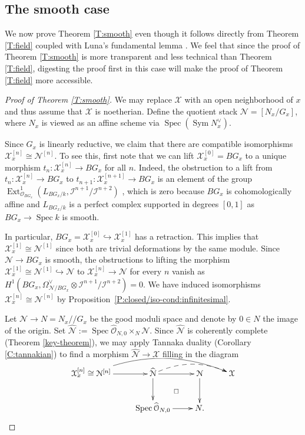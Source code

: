 \documentclass[a4paper]{amsart}
\theoremstyle{plain}
\theoremstyle{definition}
\theoremstyle{remark}
\numberwithin{equation}{section}
\newcommand{\inj}{\hookrightarrow} %
\newcommand\cI{\mathcal{I}}
\newcommand\cN{\mathcal{N}}
\newcommand\cX{\mathcal{X}}
\newcommand\oh{\mathcal{O}}
\DeclareMathOperator{\Spec}{Spec}
\DeclareMathOperator{\Sym}{Sym}
\newcommand{\gitq}{/\!\!/}
\renewcommand{\hat}{\widehat}
\DeclareMathOperator{\Ext}{Ext}
\begin{document}
 
 \subsection{The smooth case} \label{S:smooth}
 We now prove Theorem \ref{T:smooth} even though it follows directly from Theorem \ref{T:field} coupled with Luna's fundamental lemma \cite[p.~94]{luna}.
We feel that since the proof of Theorem \ref{T:smooth} is more transparent and less technical than Theorem \ref{T:field}, digesting the proof first in this case will make the proof of Theorem \ref{T:field} more accessible.
 




\begin{proof}[Proof of Theorem \ref{T:smooth}]
We may replace $\cX$ with an open neighborhood of $x$ and thus assume that
$\cX$ is noetherian. Define the quotient stack $\cN= [N_x/G_x]$, where $N_x$ is viewed as an affine scheme via $\Spec(\Sym N_x^{\vee})$.

Since $G_x$ is linearly reductive, we claim that there are compatible
isomorphisms $\cX_x^{[n]} \cong \cN^{[n]}$. 
To see this, first note that we can lift $\cX_x^{[0]}=BG_x$ to a unique morphism
$t_n\colon \cX_x^{[n]}\to BG_x$ for all $n$. Indeed, the obstruction to a lift from
$t_n\colon \cX_x^{[n]}\to BG_x$ to $t_{n+1}\colon \cX_x^{[n+1]}\to BG_x$ is an
element of the group $\Ext_{\oh_{BG_x}}^{1}(L_{BG_x/k}, \cI^{n+1}/\cI^{n+2})$
\cite{olsson-defn}, which is zero because $BG_x$ is cohomologically affine and
 $L_{BG_x/k}$ is a perfect complex supported in degrees $[0,1]$ as $BG_x\to
\Spec k$ is smooth.

In particular, $BG_x=\cX_x^{[0]}\inj \cX_x^{[1]}$ has a retraction. This implies
that $\cX_x^{[1]} \cong \cN^{[1]}$ since both are trivial deformations by the
same module. Since $\cN\to BG_x$ is smooth, the obstructions to lifting the
morphism $\cX_x^{[1]}\cong \cN^{[1]}\inj \cN$ to $\cX_x^{[n]}\to \cN$ for every $n$
vanish as
$H^1(BG_x,\Omega_{\cN/BG_x}^\vee\otimes \cI^{n+1}/\cI^{n+2})=0$.  We have induced
isomorphisms $\cX_x^{[n]} \cong \cN^{[n]}$ by
Proposition~\ref{P:closed/iso-cond:infinitesimal}.


Let $\cN  \to  N = N_x \gitq G_x$ be the good moduli space and denote by $0 \in N$ the image of the origin.     Set $\hat{\cN} := \Spec \hat{\oh}_{N,0} \times_N \cN$.  Since $\hat{\cN}$ is coherently complete (Theorem \ref{key-theorem}), we may apply Tannaka duality (Corollary \ref{C:tannakian}) to find a morphism $\hat{\cN} \to \cX$ filling in the diagram
\vspace{.2cm}
$$
\xymatrix{
\cX_x^{[n]} \cong \cN^{[n]} \ar[r] \ar@/^1.6pc/[rrr]	& \hat{\cN} \ar[r] \ar[d]	\ar@/^1pc/@{-->}[rr]					& \cN \ar[d] & \cX\\
& \Spec \hat{\oh}_{N,0} \ar[r]	\ar@{}[ur]|\square				& N.
}
$$



\end{proof}
\end{document}
